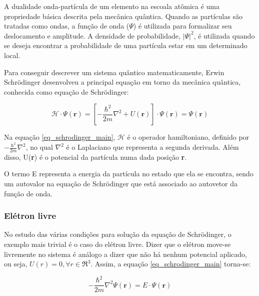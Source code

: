 \par A dualidade onda-partícula de um elemento na escoala atômica é uma propriedade básica descrita pela mecânica quântica\cite{qm_fis3}. Quando as partículas são tratadas como ondas, a função de onda ($\Psi$) é utilizada para formalizar seu deslocamento e amplitude\cite{qm_fis4}. A densidade de probabilidade, $\left| \Psi \right|^2$, é utilizada quando se deseja encontrar a probabilidade de uma partícula estar em um determinado local.

\par Para conseguir descrever um sistema quântico matematicamente, Erwin Schrödinger desenvolveu a principal equação em torno da mecânica quântica, conhecida como equação de Schrödinger:

\begin{equation}\label{eq_schrodinger_main}
  \mathcal{H} \cdot \Psi(\mathbf{r}) = \left[ -\frac{\hbar^2}{2m}\nabla^2 + U(\textbf{r}) \right] \cdot \Psi(\mathbf{r}) = \Psi(\mathbf{r})
\end{equation}

\par Na equação \eqref{eq_schrodinger_main}, $\mathcal{H}$ é o operador hamiltoniano, definido por $ -\frac{\hbar^2}{2m}\nabla^2 $\cite{frustrado3}, no qual $\nabla^2$ é o Laplaciano que representa a segunda derivada. Além disso, U(\textbf{r}) é o potencial da partícula numa dada posição \textbf{r}.

\par O termo E representa a energia da partícula no estado que ela se encontra, sendo um autovalor na equação de Schrödinger que está associado ao autovetor da função de onda.


\subsubsection{Elétron livre}

  \par No estudo das várias condições para solução da equação de Schrödinger, o exemplo mais trivial é o caso do elétron livre. Dizer que o elétron move-se livremente no sistema é análogo a dizer que não há nenhum potencial aplicado, ou seja, $U(r) = 0,   \forall r \in \Re^3$. Assim, a equação \eqref{eq_schrodinger_main} torna-se:

  \begin{equation}\label{schrodinger_1}
    -\frac{\hbar^2}{2m}\nabla^2 \Psi(\mathbf{r}) = E \cdot \Psi(\mathbf{r})
  \end{equation}

